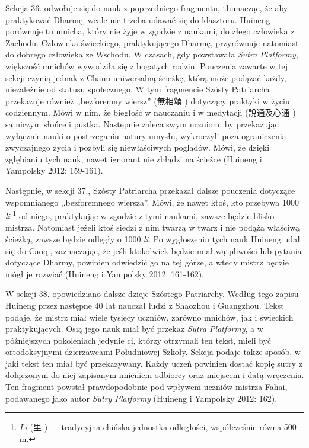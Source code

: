 Sekcja 36. odwołuje się do nauk z poprzedniego fragmentu, tłumacząc, że aby praktykować Dharmę, wcale nie trzeba udawać się do klasztoru.
Huineng porównuje tu mnicha, który nie żyje w zgodzie z naukami, do złego człowieka z Zachodu.
Człowieka świeckiego, praktykującego Dharmę, przyrównuje natomiast do dobrego człowieka ze Wschodu.
W czasach, gdy powstawała \textit{Sutra Platformy}, większość mnichów wywodziła się z bogatych rodzin.
Pouczenia zawarte w tej sekcji czynią jednak z Chanu uniwersalną ścieżkę, którą może podążać każdy, niezależnie od statusu społecznego.
W tym fragmencie Szósty Patriarcha przekazuje również „bezforemny wiersz” (無相頌 ) dotyczący praktyki w życiu codziennym.
Mówi w nim, że biegłość w nauczaniu i w medytacji (說通及心通 ) są niczym słońce i pustka.
Następnie zaleca swym uczniom, by przekazując wyłącznie nauki o postrzeganiu natury umysłu, wykroczyli poza ograniczenia zwyczajnego życia i pozbyli się niewłaściwych poglądów. %
Mówi, że dzięki zgłębianiu tych nauk, nawet ignorant nie zbłądzi na ścieżce %
(Huineng i Yampolsky 2012: 159-161).

Następnie, w sekcji 37., Szósty Patriarcha przekazał dalsze pouczenia dotyczące wspomnianego ,,bezforemnego wiersza''.
Mówi, że nawet ktoś, kto przebywa  1000 \textit{li}%
\footnote{\textit{Li} (里 ) --- tradycyjna chińska jednostka odległości, współcześnie równa 500 m.} od niego, praktykując w zgodzie z tymi naukami, zawsze będzie blisko mistrza.
Natomiast jeżeli ktoś siedzi z nim twarzą w twarz i nie podąża właściwą ścieżką, zawsze będzie odległy o 1000 \textit{li}.
Po wygłoszeniu tych nauk Huineng udał się do Caoqi, zaznaczając, że jeśli ktokolwiek będzie miał wątpliwości lub pytania dotyczące Dharmy, powinien odwiedzić go na tej górze, a wtedy mistrz będzie mógł je rozwiać %
(Huineng i Yampolsky 2012: 161-162).

W sekcji 38. opowiedziano dalsze dzieje Szóstego Patriarchy.
Według tego zapisu Huineng przez następne 40 lat nauczał ludzi z Shaozhou i Guangzhou.
Tekst podaje, że mistrz miał wiele tysięcy uczniów, zarówno mnichów, jak i świeckich praktykujących.
Osią jego nauk miał być przekaz \textit{Sutra Platformy}, a w późniejszych pokoleniach jedynie ci, którzy otrzymali ten tekst, mieli być ortodoksyjnymi dzierżawcami Południowej Szkoły.
Sekcja podaje także sposób, w jaki tekst ten miał być przekazywany.
Każdy uczeń powinien dostać kopię sutry z dołączonym do niej zapisanym imieniem odbiorcy oraz miejscem i datą wręczenia.
Ten fragment powstał prawdopodobnie pod wpływem uczniów mistrza Fahai, podawanego jako autor \textit{Sutry Platformy} %
(Huineng i Yampolsky 2012: 162).


